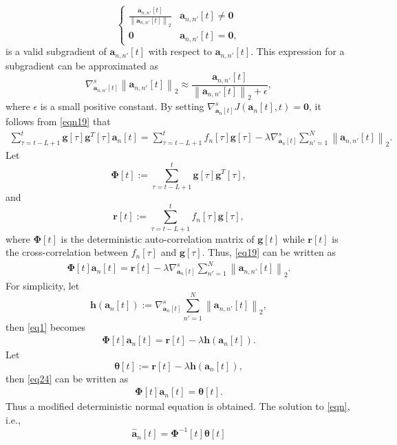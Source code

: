 \documentclass[11pt,final,onecolumn]{IEEEtran}
\begin{document}
\begin{itemize}
\begin{equation}
\begin{cases}
\frac{\bm a_{n,n'}[t]}{\left \lVert \bm a_{n,n'}[t] \right \rVert_2} & \bm a_{n,n'}[t]\neq \bm 0\\
\bm 0 & \bm a_{n,n'}[t]= \bm 0,
\end{cases}
\end{equation}
is a valid subgradient of $\bm a_{n,n'}[t]$ with respect to $\bm a_{n,n'}[t]$.
This expression for a subgradient can be approximated as 
\begin{equation}\label{key34}
\nabla_{\bm a_{n,n'}[t]} ^s\left \lVert \bm a_{n,n'}[t]\right\rVert_2\approx \frac{\bm a_{n,n'}[t]}{\left \lVert \bm a_{n,n'}[t] \right \rVert_2+ \epsilon},
\end{equation} 
where $\epsilon$ is a small positive constant.
By setting $\nabla_{\bm a_n[t]}^{s}J(\bm a_n[t],t)=\bm 0$, it follows from \eqref{eqn19} that
\begin{align} \label{eq19}
\sum_{\tau=t-L+1}^{t}\bm g[\tau]\bm g^T[\tau]\bm a_n[t]=\sum_{\tau=t-L+1}^{t} f_n[\tau]\bm g[\tau]-\lambda \nabla_{\bm a_n[t]} ^s \sum_{n'=1}^{N} \left \lVert \bm a_{n,n'}[t]\right\rVert_2.
\end{align}
Let
\begin{equation}\label{key}
\bm \Phi [t]:=\sum_{\tau=t-L+1}^{t}\bm g[\tau]\bm g^T[\tau],
\end{equation}
and 
\begin{equation}\label{key}
\bm r[t]:=\sum_{\tau=t-L+1}^{t} f_n[\tau]\bm g[\tau],
\end{equation}
where $\bm\Phi [t]$ is the deterministic auto-correlation matrix of $\bm g[t]$ while $\bm r[t]$ is the cross-correlation between $f_n[\tau]$ and $\bm g[\tau]$. Thus, \eqref{eq19} can be written as
\begin{align} \label{eq1}
\bm\Phi [t] \bm a_n[t]=\bm r[t]-\lambda \nabla_{\bm a_n[t]} ^s \sum_{n'=1}^{N}\left \lVert \bm a_{n,n'}[t]\right\rVert_2. 
\end{align}
For simplicity, let 
\begin{equation}\label{eqgrad}
\bm h(\bm a_n[t]):=\nabla_{\bm a_n[t]} ^s \sum_{n'=1}^{N}\left \lVert \bm a_{n,n'}[t]\right\rVert_2,
\end{equation} 
then \eqref{eq1} becomes
\begin{align} \label{eq24}
\bm\Phi [t] \bm a_n[t]=\bm r[t]-\lambda  \bm h(\bm a_n[t]).
\end{align}
Let 
\begin{equation} \label{eqt}
\bm \theta [t]:=\bm r[t]-\lambda  \bm h(\bm a_n[t]),
\end{equation} then \eqref{eq24} can be written as
\begin{align} \label{eqn}
\bm\Phi [t] \bm a_n[t]=\bm \theta [t].
\end{align}
Thus a modified deterministic normal equation is obtained. The solution to \eqref{eqn}, i.e., 
\begin{equation}\label{eqsol}
\hat{\bm a}_n[t]=\bm\Phi ^{-1}[t] \bm \theta [t]
\end{equation}
 

\end{itemize}
\end{document}
